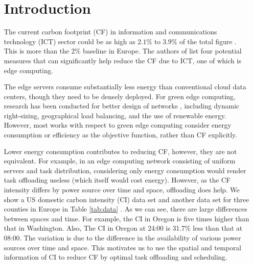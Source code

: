 \documentclass[conference, 10pt, ﬁnal, letterpaper, twocolumn]{IEEEtran}
\begin{document}
\section{Introduction}
The current carbon footprint (CF) in information and communications technology (ICT) sector could be as high as $2.1\%$ to $3.9\%$ of the total figure \cite{https://doi.org/10.48550/arxiv.2102.02622}. This is more than the $2\%$ baseline in Europe. The authors of \cite{perrons2021digital} list four potential measures that can significantly help reduce the CF due to ICT, one of which is edge computing. 

The edge servers consume substantially less energy than conventional cloud data centers, though they need to be densely deployed. For green edge computing, research has been conducted for better design of networks \cite{mao2017survey}, including dynamic right-sizing, geographical load balancing, and the use of renewable energy. However, most works with respect to green edge computing consider energy consumption or efficiency as the objective function, rather than CF explicitly. 

Lower energy consumption contributes to reducing CF, however, they are not equivalent. For example, in an edge computing network consisting of uniform servers and task distribution, considering only energy consumption would render task offloading useless (which itself would cost energy). However, as the CF intensity differs by power source over time and space, offloading does help. We show a US domestic carbon intensity (CI) data set and another data set for three counties in Europe in Table \ref{tab:data} \cite{ElectricityMaps}. As we can see, there are large differences between spaces and time. For example, the CI in Oregon is five times higher than that in Washington. Also, The CI in Oregon at 24:00 is 31.7\% less than that at 08:00. The variation is due to the difference in the availability of various power sources over time and space. This motivates us to use the spatial and temporal information of CI to reduce CF by optimal task offloading and scheduling.  
\end{document}
